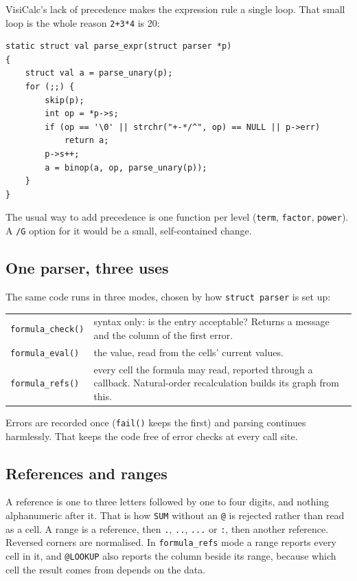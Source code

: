 \documentclass[11pt]{article}
\begin{document}
VisiCalc's lack of precedence makes the expression rule a single loop.
That small loop is the whole reason \texttt{2+3*4} is 20:

\begin{lstlisting}[style=c]
static struct val parse_expr(struct parser *p)
{
    struct val a = parse_unary(p);
    for (;;) {
        skip(p);
        int op = *p->s;
        if (op == '\0' || strchr("+-*/^", op) == NULL || p->err)
            return a;
        p->s++;
        a = binop(a, op, parse_unary(p));
    }
}
\end{lstlisting}

The usual way to add precedence is one function per level
(\texttt{term}, \texttt{factor}, \texttt{power}). A \texttt{/G} option
for it would be a small, self-contained change.

\subsection{One parser, three uses}

The same code runs in three modes, chosen by how \texttt{struct parser} is
set up:

\begin{center}
\begin{tabularx}{\linewidth}{@{}lX@{}}
\toprule
\texttt{formula\_check()} & syntax only: is the entry acceptable? Returns a
  message and the column of the first error. \\
\texttt{formula\_eval()} & the value, read from the cells' current values. \\
\texttt{formula\_refs()} & every cell the formula may read, reported through
  a callback. Natural-order recalculation builds its graph from this. \\
\bottomrule
\end{tabularx}
\end{center}

Errors are recorded once (\texttt{fail()} keeps the first) and parsing
continues harmlessly. That keeps the code free of error checks at every
call site.

\subsection{References and ranges}

A reference is one to three letters followed by one to four digits, and
nothing alphanumeric after it. That is how \texttt{SUM} without an
\texttt{@} is rejected rather than read as a cell. A range is a reference,
then \texttt{.}, \texttt{..}, \texttt{...} or \texttt{:}, then another
reference. Reversed corners are normalised. In \texttt{formula\_refs} mode
a range reports every cell in it, and \texttt{@LOOKUP} also reports the
column beside its range, because which cell the result comes from depends
on the data.
\end{document}
